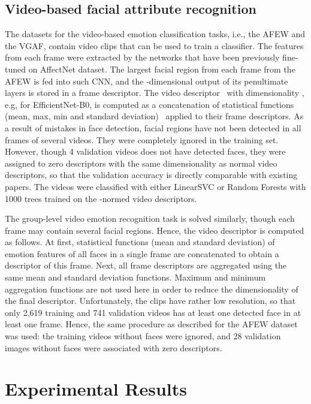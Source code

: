 \documentclass[runningheads]{llncs}
\begin{document}
\subsection{Video-based facial attribute recognition} 
The datasets for the video-based emotion classification tasks, i.e., the AFEW and the VGAF, contain video clips that can be used to train a classifier. The features from each frame were extracted by the networks that have been previously fine-tuned on AffectNet dataset. The largest facial region from each frame from the AFEW is fed into such CNN, and the -dimensional output of its penultimate layers is stored in a frame descriptor. The video descriptor~\cite{savchenko2018granular} with dimensionality , e.g,  for EfficientNet-B0, is computed as a concatenation of statistical functions (mean, max, min and standard deviation)~\cite{demochkina2021mobileemotiface} applied to their frame descriptors. As a result of mistakes in face detection, facial regions have not been detected in all frames of several videos. They were completely ignored in the training set. However, though 4 validation videos does not have detected faces, they were assigned to zero descriptors with the same dimensionality as normal video descriptors, so that the validation accuracy is directly comparable with existing papers. The videos were classified with either LinearSVC or Random Forests with 1000 trees trained on the -normed video descriptors. 

The group-level video emotion recognition task is solved similarly, though each frame may contain several facial regions. Hence, the video descriptor is computed as follows. At first, statistical functions (mean and standard deviation) of emotion features of all faces in a single frame are concatenated to obtain a descriptor of this frame. Next, all frame descriptors are aggregated using the same mean and standard deviation functions. Maximum and minimum aggregation functions are not used here in order to reduce the dimensionality of the final descriptor. Unfortunately, the clips have rather low resolution, so that only 2,619 training and 741 validation videos has at least one detected face in at least one frame. Hence, the same procedure as described for the AFEW dataset was used: the training videos without faces were ignored, and 28 validation images without faces were associated with zero descriptors.

\section{Experimental Results}\label{sec:4}
\end{document}
